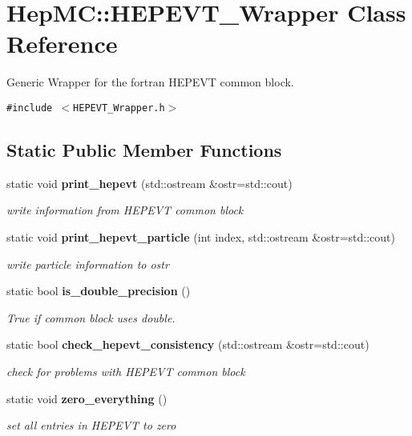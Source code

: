 \section{Hep\-MC::HEPEVT\_\-Wrapper Class Reference}
\label{classHepMC_1_1HEPEVT__Wrapper}
Generic Wrapper for the fortran HEPEVT common block.  


{\tt \#include $<$HEPEVT\_\-Wrapper.h$>$}

\subsection*{Static Public Member Functions}
\begin{CompactItemize}
\item 
static void {\bf print\_\-hepevt} (std::ostream \&ostr=std::cout)
\begin{CompactList}\small\item\em write information from HEPEVT common block \item\end{CompactList}\item 
static void {\bf print\_\-hepevt\_\-particle} (int index, std::ostream \&ostr=std::cout)
\begin{CompactList}\small\item\em write particle information to ostr \item\end{CompactList}\item 
static bool {\bf is\_\-double\_\-precision} ()
\begin{CompactList}\small\item\em True if common block uses double. \item\end{CompactList}\item 
static bool {\bf check\_\-hepevt\_\-consistency} (std::ostream \&ostr=std::cout)
\begin{CompactList}\small\item\em check for problems with HEPEVT common block \item\end{CompactList}\item 
static void {\bf zero\_\-everything} ()
\begin{CompactList}\small\item\em set all entries in HEPEVT to zero \item\end{CompactList}\item 

\end{CompactItemize}
